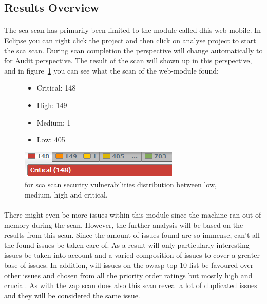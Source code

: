 \documentclass[11pt,english,a4paper]{report}
\begin{document}
\subsection{Results Overview}
\paragraph{}
The \gls{sca} scan has primarily been limited to the module called dhis-web-mobile. In Eclipse you can right click the project and then click on analyse project to start the \gls{sca} scan.
During scan completion the perspective will change automatically to \gls{for} Audit perspective.
The result of the scan will shown up in this perspective, and in figure~\ref{fig:issuesfoundmobilemodule} you can see what the scan of the web-module found:

\begin{figure}[ht]
\RawFloats
    \begin{minipage}[b]{0.48\linewidth}
        \begin{itemize}
			\item Critical: 148
			\item High: 149
			\item Medium: 1
			\item Low: 405
		\end{itemize}
    \end{minipage}
    \hfill
    \begin{minipage}[b]{0.48\linewidth}
	    \centering
	    \includegraphics[scale=0.65]{images/foundissues.png}
	    \caption{\gls{for} \gls{sca} scan security vulnerabilities distribution between low, medium, high and critical. }
    	\label{fig:issuesfoundmobilemodule}
    \end{minipage}
\end{figure}

\paragraph{}
There might even be more issues within this module since the machine ran out of memory during the scan.
However, the further analysis will be based on the results from this scan.
Since the amount of issues found are so immense, can't all the found issues be taken care of. 
As a result will only particularly interesting issues be taken into account and a varied composition of issues to cover a greater base of issues.
In addition, will issues on the \gls{owasp} top 10 list be favoured over other issues and chosen from all the priority order ratings but mostly high and crucial.
As with the \gls{zap} scan does also this scan reveal a lot of duplicated issues and they will be considered the same issue.
\end{document}
